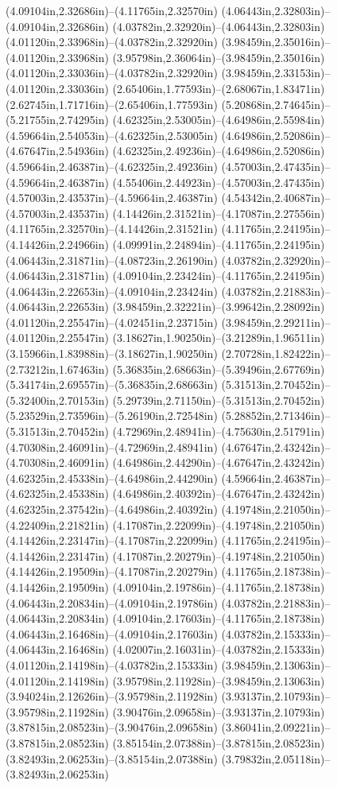 (4.09104in,2.32686in)--(4.11765in,2.32570in) (4.06443in,2.32803in)--(4.09104in,2.32686in) (4.03782in,2.32920in)--(4.06443in,2.32803in) (4.01120in,2.33968in)--(4.03782in,2.32920in) (3.98459in,2.35016in)--(4.01120in,2.33968in) (3.95798in,2.36064in)--(3.98459in,2.35016in) (4.01120in,2.33036in)--(4.03782in,2.32920in) (3.98459in,2.33153in)--(4.01120in,2.33036in) (2.65406in,1.77593in)--(2.68067in,1.83471in) (2.62745in,1.71716in)--(2.65406in,1.77593in) (5.20868in,2.74645in)--(5.21755in,2.74295in) (4.62325in,2.53005in)--(4.64986in,2.55984in) (4.59664in,2.54053in)--(4.62325in,2.53005in) (4.64986in,2.52086in)--(4.67647in,2.54936in) (4.62325in,2.49236in)--(4.64986in,2.52086in) (4.59664in,2.46387in)--(4.62325in,2.49236in) (4.57003in,2.47435in)--(4.59664in,2.46387in) (4.55406in,2.44923in)--(4.57003in,2.47435in) (4.57003in,2.43537in)--(4.59664in,2.46387in) (4.54342in,2.40687in)--(4.57003in,2.43537in) (4.14426in,2.31521in)--(4.17087in,2.27556in) (4.11765in,2.32570in)--(4.14426in,2.31521in) (4.11765in,2.24195in)--(4.14426in,2.24966in) (4.09991in,2.24894in)--(4.11765in,2.24195in) (4.06443in,2.31871in)--(4.08723in,2.26190in) (4.03782in,2.32920in)--(4.06443in,2.31871in) (4.09104in,2.23424in)--(4.11765in,2.24195in) (4.06443in,2.22653in)--(4.09104in,2.23424in) (4.03782in,2.21883in)--(4.06443in,2.22653in) (3.98459in,2.32221in)--(3.99642in,2.28092in) (4.01120in,2.25547in)--(4.02451in,2.23715in) (3.98459in,2.29211in)--(4.01120in,2.25547in) (3.18627in,1.90250in)--(3.21289in,1.96511in) (3.15966in,1.83988in)--(3.18627in,1.90250in) (2.70728in,1.82422in)--(2.73212in,1.67463in) (5.36835in,2.68663in)--(5.39496in,2.67769in) (5.34174in,2.69557in)--(5.36835in,2.68663in) (5.31513in,2.70452in)--(5.32400in,2.70153in) (5.29739in,2.71150in)--(5.31513in,2.70452in) (5.23529in,2.73596in)--(5.26190in,2.72548in) (5.28852in,2.71346in)--(5.31513in,2.70452in) (4.72969in,2.48941in)--(4.75630in,2.51791in) (4.70308in,2.46091in)--(4.72969in,2.48941in) (4.67647in,2.43242in)--(4.70308in,2.46091in) (4.64986in,2.44290in)--(4.67647in,2.43242in) (4.62325in,2.45338in)--(4.64986in,2.44290in) (4.59664in,2.46387in)--(4.62325in,2.45338in) (4.64986in,2.40392in)--(4.67647in,2.43242in) (4.62325in,2.37542in)--(4.64986in,2.40392in) (4.19748in,2.21050in)--(4.22409in,2.21821in) (4.17087in,2.22099in)--(4.19748in,2.21050in) (4.14426in,2.23147in)--(4.17087in,2.22099in) (4.11765in,2.24195in)--(4.14426in,2.23147in) (4.17087in,2.20279in)--(4.19748in,2.21050in) (4.14426in,2.19509in)--(4.17087in,2.20279in) (4.11765in,2.18738in)--(4.14426in,2.19509in) (4.09104in,2.19786in)--(4.11765in,2.18738in) (4.06443in,2.20834in)--(4.09104in,2.19786in) (4.03782in,2.21883in)--(4.06443in,2.20834in) (4.09104in,2.17603in)--(4.11765in,2.18738in) (4.06443in,2.16468in)--(4.09104in,2.17603in) (4.03782in,2.15333in)--(4.06443in,2.16468in) (4.02007in,2.16031in)--(4.03782in,2.15333in) (4.01120in,2.14198in)--(4.03782in,2.15333in) (3.98459in,2.13063in)--(4.01120in,2.14198in) (3.95798in,2.11928in)--(3.98459in,2.13063in) (3.94024in,2.12626in)--(3.95798in,2.11928in) (3.93137in,2.10793in)--(3.95798in,2.11928in) (3.90476in,2.09658in)--(3.93137in,2.10793in) (3.87815in,2.08523in)--(3.90476in,2.09658in) (3.86041in,2.09221in)--(3.87815in,2.08523in) (3.85154in,2.07388in)--(3.87815in,2.08523in) (3.82493in,2.06253in)--(3.85154in,2.07388in) (3.79832in,2.05118in)--(3.82493in,2.06253in) 